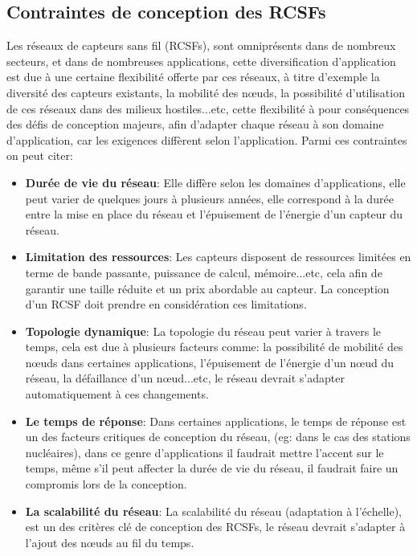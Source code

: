 \subsection{Contraintes de conception des RCSFs }
Les réseaux de capteurs sans fil (RCSFs), sont omniprésents dans de nombreux secteurs, et dans de nombreuses applications, cette diversification d'application est due  à une certaine flexibilité offerte par ces réseaux, à titre d'exemple la diversité des capteurs existants, la mobilité des nœuds, la possibilité d'utilisation de ces réseaux dans des milieux hostiles...etc, cette flexibilité à pour conséquences des défis de conception majeurs, afin d'adapter chaque réseau à son domaine d'application, car les exigences diffèrent selon l'application.
Parmi ces contraintes on peut citer:
\begin{itemize}
\item \textbf{Durée de vie du réseau}: Elle diffère selon les domaines d'applications, elle peut varier de quelques jours à plusieurs années, elle correspond à la durée entre la mise en place du réseau et l'épuisement de l'énergie d'un capteur du réseau.\\

\item \textbf{Limitation des ressources}: Les capteurs disposent de ressources limitées en terme de bande passante, puissance de calcul, mémoire...etc, cela afin de garantir une taille réduite et un prix abordable au capteur. La conception d'un RCSF doit prendre en considération ces limitations.\\

\item \textbf{Topologie dynamique}: La topologie du réseau peut varier à travers le temps, cela est due à plusieurs facteurs comme: la possibilité de mobilité des nœuds dans certaines applications, l'épuisement de l'énergie d'un nœud du réseau, la défaillance d'un nœud...etc, le réseau devrait s'adapter automatiquement à ces changements.\\

\item \textbf{Le temps de réponse}: Dans certaines applications, le temps de réponse est un des facteurs critiques de conception du réseau, (eg: dans le cas des stations nucléaires), dans ce genre d'applications il faudrait mettre l'accent sur le temps, même s'il peut affecter la durée de vie du réseau, il faudrait faire un compromis lors de la conception.\\

\item \textbf{La scalabilité du réseau}: La scalabilité  du réseau (adaptation à l'échelle), est un des critères clé de conception des RCSFs, le réseau devrait s'adapter à l'ajout des nœuds au fil du temps.\\


 

\end{itemize}



